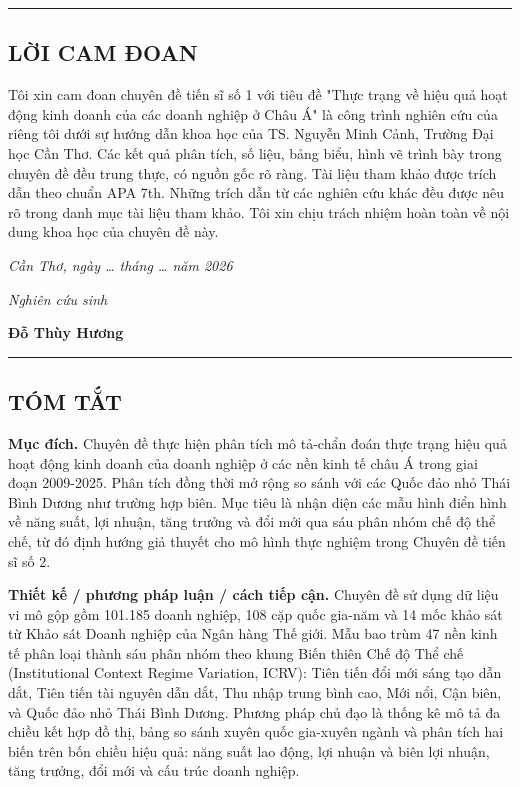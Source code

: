 \documentclass[12pt,a4paper]{article}
\begin{document}
\begin{center}\rule{0.5\linewidth}{0.5pt}\end{center}

\hypertarget{lux1eddi-cam-ux111oan}{%
\subsection{LỜI CAM ĐOAN}\label{lux1eddi-cam-ux111oan}}

Tôi xin cam đoan chuyên đề tiến sĩ số 1 với tiêu đề "Thực trạng về hiệu
quả hoạt động kinh doanh của các doanh nghiệp ở Châu Á" là công trình
nghiên cứu của riêng tôi dưới sự hướng dẫn khoa học của TS. Nguyễn Minh
Cảnh, Trường Đại học Cần Thơ. Các kết quả phân tích, số liệu, bảng biểu,
hình vẽ trình bày trong chuyên đề đều trung thực, có nguồn gốc rõ ràng.
Tài liệu tham khảo được trích dẫn theo chuẩn APA 7th. Những trích dẫn từ
các nghiên cứu khác đều được nêu rõ trong danh mục tài liệu tham khảo.
Tôi xin chịu trách nhiệm hoàn toàn về nội dung khoa học của chuyên đề
này.

\emph{Cần Thơ, ngày \ldots{} tháng \ldots{} năm 2026}

\emph{Nghiên cứu sinh}

\textbf{Đỗ Thùy Hương}

\begin{center}\rule{0.5\linewidth}{0.5pt}\end{center}

\hypertarget{tuxf3m-tux1eaft}{%
\subsection{TÓM TẮT}\label{tuxf3m-tux1eaft}}

\textbf{Mục đích.} Chuyên đề thực hiện phân tích mô tả-chẩn đoán thực
trạng hiệu quả hoạt động kinh doanh của doanh nghiệp ở các nền kinh tế
châu Á trong giai đoạn 2009-2025. Phân tích đồng thời mở rộng so sánh
với các Quốc đảo nhỏ Thái Bình Dương như trường hợp biên. Mục tiêu là
nhận diện các mẫu hình điển hình về năng suất, lợi nhuận, tăng trưởng và
đổi mới qua sáu phân nhóm chế độ thể chế, từ đó định hướng giả thuyết
cho mô hình thực nghiệm trong Chuyên đề tiến sĩ số 2.

\textbf{Thiết kế / phương pháp luận / cách tiếp cận.} Chuyên đề sử dụng
dữ liệu vi mô gộp gồm 101.185 doanh nghiệp, 108 cặp quốc gia-năm và 14
mốc khảo sát từ Khảo sát Doanh nghiệp của Ngân hàng Thế giới. Mẫu bao
trùm 47 nền kinh tế phân loại thành sáu phân nhóm theo khung Biến thiên
Chế độ Thể chế (Institutional Context Regime Variation, ICRV): Tiên tiến
đổi mới sáng tạo dẫn dắt, Tiên tiến tài nguyên dẫn dắt, Thu nhập trung
bình cao, Mới nổi, Cận biên, và Quốc đảo nhỏ Thái Bình Dương. Phương
pháp chủ đạo là thống kê mô tả đa chiều kết hợp đồ thị, bảng so sánh
xuyên quốc gia-xuyên ngành và phân tích hai biến trên bốn chiều hiệu
quả: năng suất lao động, lợi nhuận và biên lợi nhuận, tăng trưởng, đổi
mới và cấu trúc doanh nghiệp.
\end{document}
